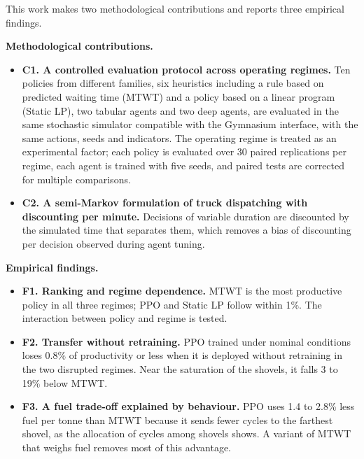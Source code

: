 \documentclass[11pt,a4paper]{article}
\newif\ifrevmarks
\newcommand{\revtag}[1]{\ifrevmarks\textsuperscript{\textcolor{red!70!black}{\scriptsize[#1]}}\fi}
\newenvironment{revbloc}[1]{\par\ifrevmarks\color{revcolor}\noindent\revtag{#1}\ \fi}{\par}
\newif\ifcorrmarks
\newcommand{\corr}[1]{\ifcorrmarks\textcolor{corrcolor}{#1}\else#1\fi}
\newenvironment{corrbloc}{\par\ifcorrmarks\color{corrcolor}\fi}{\par}
\begin{document}
\begin{revbloc}{M23, M24, M26, M16}
\begin{corrbloc}
This work makes two methodological contributions and reports three empirical findings.

\noindent\textbf{Methodological contributions.}
\begin{itemize}
  \item \textbf{C1. A controlled evaluation protocol across operating regimes.} Ten policies from different families, six heuristics including a rule based on predicted waiting time (MTWT) and a policy based on a linear program (\corr{Static LP}), two tabular agents and two deep agents, are evaluated in the same stochastic simulator compatible with the Gymnasium interface, with the same actions, seeds and indicators. The operating regime is treated as an experimental factor; each policy is evaluated over 30 paired replications per regime, each agent is trained with five seeds, and paired tests are corrected for multiple comparisons.
  \item \textbf{C2. A semi-Markov formulation of truck dispatching with discounting per minute.} Decisions of variable duration are discounted by the simulated time that separates them, which removes a bias of discounting per decision observed during agent tuning.
\end{itemize}

\noindent\textbf{Empirical findings.}
\begin{itemize}
  \item \textbf{F1. Ranking and regime dependence.} MTWT is the most productive policy in all three regimes; PPO and \corr{Static LP} follow within 1\%. The interaction between policy and regime is tested.
  \item \textbf{F2. Transfer without retraining.} PPO trained under nominal conditions loses 0.8\% of productivity or less when it is deployed without retraining in the two disrupted regimes. \corr{Near the saturation of the shovels, it falls 3 to 19\% below MTWT.}
  \item \textbf{F3. A fuel trade-off explained by behaviour.} PPO uses 1.4 to 2.8\% less fuel per tonne than MTWT because it sends fewer cycles to the farthest shovel, as the allocation of cycles among shovels shows. \corr{A variant of MTWT that weighs fuel removes most of this advantage.}
\end{itemize}
\end{corrbloc}
\end{revbloc}
\end{document}
